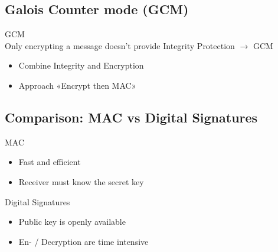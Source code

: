 
\subsection{Galois Counter mode (GCM)}

\begin{concept}{GCM}\\
    Only encrypting a message doesn't provide Integrity Protection $\rightarrow$ GCM
    \begin{itemize}
        \item Combine Integrity and Encryption
        \item Approach «Encrypt then MAC»
    \end{itemize}
\end{concept}


\subsection{Comparison: MAC vs Digital Signatures}

\begin{concept}{MAC}\\
    \begin{itemize}
        \item Fast and efficient
        \item Receiver must know the secret key
    \end{itemize}
\end{concept}

\begin{concept}{Digital Signatures}\\
    \begin{itemize}
        \item Public key is openly available
        \item En- / Decryption are time intensive
    \end{itemize}
\end{concept}